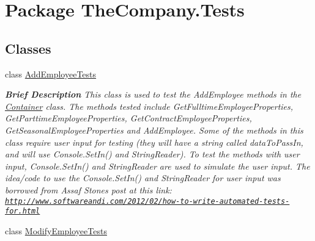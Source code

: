 \hypertarget{namespace_the_company_1_1_tests}{}\section{Package The\+Company.\+Tests}
\label{namespace_the_company_1_1_tests}
\subsection*{Classes}
\begin{DoxyCompactItemize}
\item 
class \hyperlink{class_the_company_1_1_tests_1_1_add_employee_tests}{Add\+Employee\+Tests}
\begin{DoxyCompactList}\small\item\em {\bfseries  Brief Description} This class is used to test the Add\+Employee methods in the \hyperlink{class_the_company_1_1_container}{Container} class. The methods tested include Get\+Fulltime\+Employee\+Properties, Get\+Parttime\+Employee\+Properties, Get\+Contract\+Employee\+Properties, Get\+Seasonal\+Employee\+Properties and Add\+Employee. Some of the methods in this class require user input for testing (they will have a string called data\+To\+Pass\+In, and will use Console.\+Set\+In() and String\+Reader). To test the methods with user input, Console.\+Set\+In() and String\+Reader are used to simulate the user input. The idea/code to use the Console.\+Set\+In() and String\+Reader for user input was borrowed from Assaf Stone\textquotesingle{}s post at this link\+: \href{http://www.softwareandi.com/2012/02/how-to-write-automated-tests-for.html}{\tt http\+://www.\+softwareandi.\+com/2012/02/how-\/to-\/write-\/automated-\/tests-\/for.\+html} \end{DoxyCompactList}\item 
class \hyperlink{class_the_company_1_1_tests_1_1_modify_employee_tests}{Modify\+Employee\+Tests}

\end{DoxyCompactItemize}
